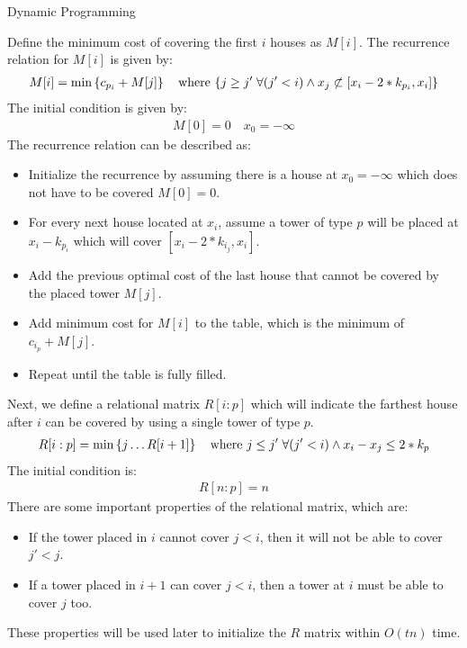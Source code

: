 \documentclass{article}
\numberwithin{table}{section}
\numberwithin{figure}{section}
\begin{document}
\begin{section}{Dynamic Programming}
\begin{enumerate}
    \begin{tcolorbox}[breakable]
        Define the minimum cost of covering the first $i$ houses as $M[i]$. The recurrence relation for $M[i]$ is given by:
        \begin{align*}
            M[i] = \min \left\{c_{p_i} + M[j]\right\} \quad \text{where $\left\{ j \geq j' \; \forall (j'< i) \land  x_j \not\subset [x_i - 2*k_{p_i}, x_i]\right\}$}
        \end{align*}
        The initial condition is given by:
        \begin{align*}
            M[0] = 0 \quad x_0 = -\infty
        \end{align*}
        The recurrence relation can be described as: 
        \begin{itemize}[noitemsep]
            \item Initialize the recurrence by assuming there is a house at $x_0 = -\infty$ which does not have to be covered $M[0] = 0$.
            \item For every next house located at $x_i$, assume a tower of type $p$ will be placed at $x_i - k_{p_i}$ which will cover $[x_i - 2*k_{i_j}, x_i]$.
            \item Add the previous optimal cost of the last house that cannot be covered by the placed tower $M[j]$.
            \item Add minimum cost for $M[i]$ to the table, which is the minimum of $c_{i_p} + M[j]$.
            \item Repeat until the table is fully filled.
        \end{itemize}
        
        Next, we define a relational matrix $R[i: p]$ which will indicate the farthest house after $i$ can be covered by using a single tower of type $p$.
        \begin{align*}
            R[i : p] = \min \left\{j \dots R[i+1]\right\} \quad \text{where $j \leq j' \; \forall(j' < i) \land x_i - x_j \leq 2*k_p$}
        \end{align*}
        The initial condition is:
        \begin{align*}
            R[n : p] = n
        \end{align*}
        There are some important properties of the relational matrix, which are:
        \begin{itemize}[noitemsep]
            \item If the tower placed in $i$ cannot cover $j < i$, then it will not be able to cover $j' < j$.
            \item If a tower placed in $i+1$ can cover $j < i$, then a tower at $i$ must be able to cover $j$ too.
        \end{itemize}
        These properties will be used later to initialize the $R$ matrix within $O(tn)$ time.
    \end{tcolorbox}
    

\end{enumerate}
\end{section}
\end{document}
